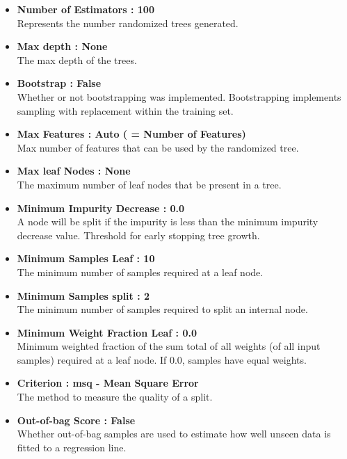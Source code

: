 \documentclass[a4paper,11pt]{report}
\numberwithin{figure}{chapter} %
\begin{document}
    \begin{itemize}
        \item[\textbullet] \textbf{Number of Estimators : 100}\\
        Represents the number randomized trees generated.
        \item[\textbullet] \textbf{Max depth : None}\\
        The max depth of the trees.
        \item[\textbullet] \textbf{Bootstrap : False}\\
        Whether or not bootstrapping was implemented.
        Bootstrapping implements sampling with replacement within the training set.
        \item[\textbullet] \textbf{Max Features : Auto ( = Number of Features)}\\
        Max number of features that can be used by the randomized tree.
        \item[\textbullet] \textbf{Max leaf Nodes : None}\\
        The maximum number of leaf nodes that be present in a tree.
        \item[\textbullet] \textbf{Minimum Impurity Decrease : 0.0}\\
        A node will be split if the impurity is less than the minimum impurity decrease value.
        Threshold for early stopping tree growth.
        \item[\textbullet] \textbf{Minimum Samples Leaf : 10}\\
        The minimum number of samples required at a leaf node.
        \item[\textbullet] \textbf{Minimum Samples split : 2}\\
        The minimum number of samples required to split an internal node.
        \item[\textbullet] \textbf{Minimum Weight Fraction Leaf : 0.0}\\
        Minimum weighted fraction of the sum total of all weights (of all input samples) required at a leaf node.
        If 0.0, samples have equal weights.
        \item[\textbullet] \textbf{Criterion : msq - Mean Square Error}\\
        The method to measure the quality of a split.
        \item[\textbullet] \textbf{Out-of-bag Score : False}\\
        Whether out-of-bag samples are used to estimate how well unseen data is fitted to a regression line.
    \end{itemize}
\end{document}
